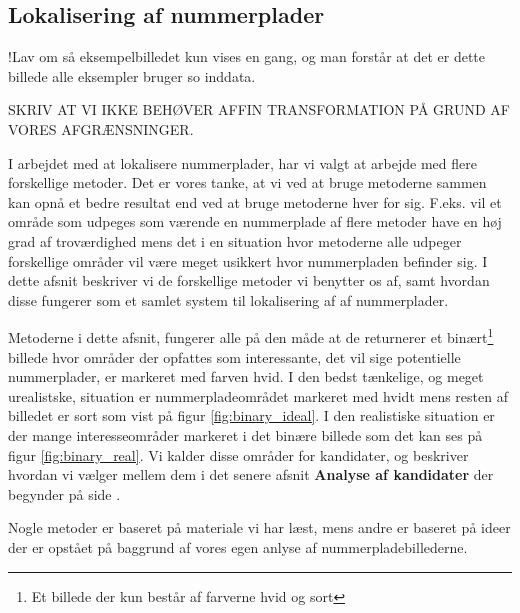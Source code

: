 \label{sec_billed}

\subsection{Lokalisering af nummerplader}
!Lav om så eksempelbilledet kun vises en gang, og man forstår at det er dette billede alle eksempler bruger so inddata.

SKRIV AT VI IKKE BEHØVER AFFIN TRANSFORMATION PÅ GRUND AF VORES AFGRÆNSNINGER.


I arbejdet med at lokalisere nummerplader, har vi valgt at arbejde med flere forskellige metoder. Det er vores tanke, at vi ved at bruge metoderne sammen kan opnå et bedre resultat end ved at bruge metoderne hver for sig. F.eks. vil et område som udpeges som værende en nummerplade af flere metoder have en høj grad af troværdighed mens det i en situation hvor metoderne alle udpeger forskellige områder vil være meget usikkert hvor nummerpladen befinder sig. I dette afsnit beskriver vi de forskellige metoder vi benytter os af, samt hvordan disse fungerer som et samlet system til lokalisering af af nummerplader. 

Metoderne i dette afsnit, fungerer alle på den måde at de returnerer et binært\footnote{Et billede der kun består af farverne hvid og sort} billede hvor områder der opfattes som interessante, det vil sige potentielle nummerplader, er markeret med farven hvid. I den bedst tænkelige, og meget urealistske, situation er nummerpladeområdet markeret med hvidt mens resten af billedet er sort som vist på figur \vref{fig:binary_ideal}. I den realistiske situation er der mange interesseområder markeret i det binære billede som det kan ses på figur \vref{fig:binary_real}. Vi kalder disse områder for kandidater, og beskriver hvordan vi vælger mellem dem i det senere afsnit \textbf{Analyse af kandidater} der begynder på side \pageref{sec:kandidater}.

Nogle metoder er baseret på materiale vi har læst, mens andre er baseret på ideer der er opstået på baggrund af vores egen anlyse af nummerpladebillederne. 

